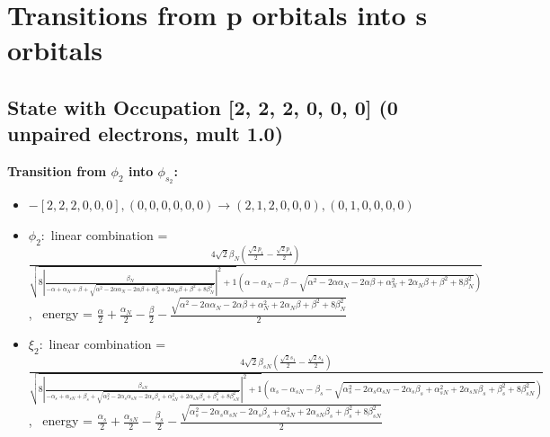 \documentclass[12pt,a4paper]{article}
\begin{document}
\newpage \section*{Transitions from p orbitals into s orbitals}\subsection*{State with Occupation [2, 2, 2, 0, 0, 0] (0 unpaired electrons, mult 1.0)}
        \noindent\textbf{Transition from $\phi_{2}$ into $\phi_{s_{2}}$:}
        \begin{itemize}
            \item $- [2, 2, 2, 0, 0, 0], (0, 0, 0, 0, 0, 0) \rightarrow (2, 1, 2, 0, 0, 0), (0, 1, 0, 0, 0, 0)$
        
            \item $\phi_{2}:$ linear combination = $\frac{4 \sqrt{2} \beta_{N} \left(\frac{\sqrt{2} p_{1}}{2} - \frac{\sqrt{2} p_{4}}{2}\right)}{\sqrt{8 \left|{\frac{\beta_{N}}{- \alpha + \alpha_{N} + \beta + \sqrt{\alpha^{2} - 2 \alpha \alpha_{N} - 2 \alpha \beta + \alpha_{N}^{2} + 2 \alpha_{N} \beta + \beta^{2} + 8 \beta_{N}^{2}}}}\right|^{2} + 1} \left(\alpha - \alpha_{N} - \beta - \sqrt{\alpha^{2} - 2 \alpha \alpha_{N} - 2 \alpha \beta + \alpha_{N}^{2} + 2 \alpha_{N} \beta + \beta^{2} + 8 \beta_{N}^{2}}\right)}$, \
            energy = $\frac{\alpha}{2} + \frac{\alpha_{N}}{2} - \frac{\beta}{2} - \frac{\sqrt{\alpha^{2} - 2 \alpha \alpha_{N} - 2 \alpha \beta + \alpha_{N}^{2} + 2 \alpha_{N} \beta + \beta^{2} + 8 \beta_{N}^{2}}}{2}$
            
            \item $\xi_{2}:$ linear combination = $\frac{4 \sqrt{2} \beta_{s N} \left(\frac{\sqrt{2} s_{1}}{2} - \frac{\sqrt{2} s_{4}}{2}\right)}{\sqrt{8 \left|{\frac{\beta_{s N}}{- \alpha_{s} + \alpha_{s N} + \beta_{s} + \sqrt{\alpha_{s}^{2} - 2 \alpha_{s} \alpha_{s N} - 2 \alpha_{s} \beta_{s} + \alpha_{s N}^{2} + 2 \alpha_{s N} \beta_{s} + \beta_{s}^{2} + 8 \beta_{s N}^{2}}}}\right|^{2} + 1} \left(\alpha_{s} - \alpha_{s N} - \beta_{s} - \sqrt{\alpha_{s}^{2} - 2 \alpha_{s} \alpha_{s N} - 2 \alpha_{s} \beta_{s} + \alpha_{s N}^{2} + 2 \alpha_{s N} \beta_{s} + \beta_{s}^{2} + 8 \beta_{s N}^{2}}\right)}$, \
            energy = $\frac{\alpha_{s}}{2} + \frac{\alpha_{s N}}{2} - \frac{\beta_{s}}{2} - \frac{\sqrt{\alpha_{s}^{2} - 2 \alpha_{s} \alpha_{s N} - 2 \alpha_{s} \beta_{s} + \alpha_{s N}^{2} + 2 \alpha_{s N} \beta_{s} + \beta_{s}^{2} + 8 \beta_{s N}^{2}}}{2}$
            

\end{itemize}
\end{document}
